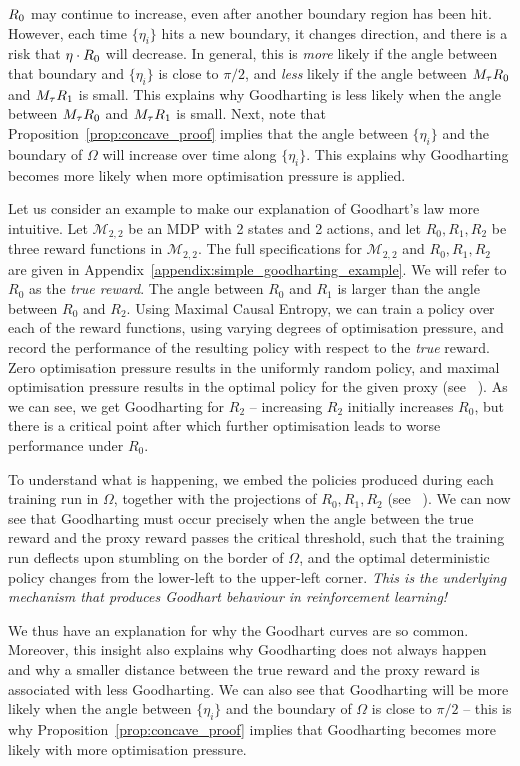 $R_0$ may continue to increase, even after another boundary region has been hit.
However, each time $\{\eta_i\}$ hits a new boundary, it changes direction, and there is a risk that $\eta \cdot R_0$ will decrease.
In general, this is \emph{more} likely if the angle between that boundary and $\{\eta_i\}$ is close to $\pi/2$, and \emph{less} likely if the angle between $M_\tau R_0$ and $M_\tau R_1$ is small. This explains why Goodharting is less likely when the angle between $M_\tau R_0$ and $M_\tau R_1$ is small. 
%
Next, note that Proposition~\ref{prop:concave_proof} implies that the angle between $\{\eta_i\}$ and the boundary of $\Omega$ will increase over time along $\{\eta_i\}$. This explains why Goodharting becomes more likely when more optimisation pressure is applied.

Let us consider an example to make our explanation of Goodhart's law more intuitive.
Let $\mathcal{M}_{2, 2}$ be an MDP with 2 states and 2 actions, and let $R_0, R_1, R_2$ be three reward functions in $\mathcal{M}_{2, 2}$.
The full specifications for $\mathcal{M}_{2, 2}$ and $R_0, R_1, R_2$ are given in Appendix~\ref{appendix:simple_goodharting_example}.
We will refer to $R_0$ as the \emph{true reward}.
The angle between $R_0$ and $R_1$ is larger than the angle between $R_0$ and $R_2$.
Using Maximal Causal Entropy, we can train a policy over each of the reward functions, using varying degrees of optimisation pressure, and record the performance of the resulting policy with respect to the \emph{true} reward.
Zero optimisation pressure results in the uniformly random policy, and maximal optimisation pressure results in the optimal policy for the given proxy (see ~).
As we can see, we get Goodharting for $R_2$ -- increasing $R_2$ initially increases $R_0$, but there is a critical point after which further optimisation leads to worse performance under $R_0$.


To understand what is happening, we embed the policies produced during each training run in $\Omega$, together with the projections of $R_0, R_1, R_2$ (see ~). We can now see that Goodharting must occur precisely when the angle between the true reward and the proxy reward passes the critical threshold, such that the training run deflects upon stumbling on the border of $\Omega$, and the optimal deterministic policy changes from the lower-left to the upper-left corner.
\emph{This is the underlying mechanism that produces Goodhart behaviour in reinforcement learning!}

We thus have an explanation for why the Goodhart curves are so common.
Moreover, this insight also explains why Goodharting does not always happen and why a smaller distance between the true reward and the proxy reward is associated with less Goodharting. We can also see that Goodharting will be more likely when the angle between $\{\eta_i\}$ and the boundary of $\Omega$ is close to $\pi/2$ -- this is why Proposition~\ref{prop:concave_proof} implies that Goodharting becomes more likely with more optimisation pressure.

